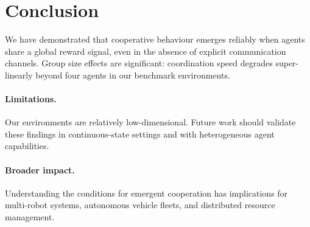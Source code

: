 \section{Conclusion}
\label{sec:conclusion}

We have demonstrated that cooperative behaviour emerges reliably when agents share
a global reward signal, even in the absence of explicit communication channels.
Group size effects are significant: coordination speed degrades super-linearly
beyond four agents in our benchmark environments.

\paragraph{Limitations.}
Our environments are relatively low-dimensional. Future work should validate
these findings in continuous-state settings and with heterogeneous agent capabilities.

\paragraph{Broader impact.}
Understanding the conditions for emergent cooperation has implications for
multi-robot systems, autonomous vehicle fleets, and distributed resource management.
